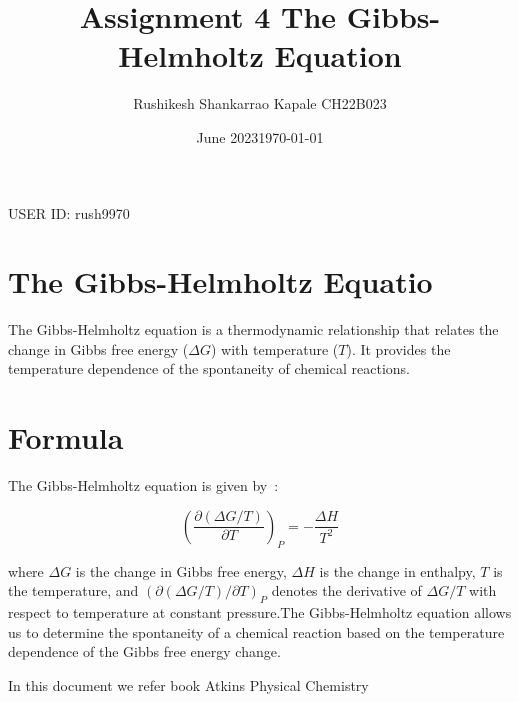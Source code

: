 \documentclass[12pt,a4paper]{article}
\title{Assignment 4 }
\author{Rushikesh Shankarrao Kapale CH22B023}
\date{June 2023}
\begin{document}
\maketitle
\begin{center}
    USER ID: rush9970
\end{center}
\title{The Gibbs-Helmholtz Equation}

\date{\today}



\maketitle

\section{The Gibbs-Helmholtz Equatio}
The Gibbs-Helmholtz equation is a thermodynamic relationship that relates the change in Gibbs free energy (\(\Delta G\)) with temperature (\(T\)). It provides  the temperature dependence of the spontaneity of chemical reactions. 

\section{Formula}
The Gibbs-Helmholtz equation is given by~\cite{Atkins}:

\begin{equation}
\left(\frac{\partial (\Delta G / T)}{\partial T}\right)_P = -\frac{\Delta H}{T^2}\label{eqn:atkins}
\end{equation}

where \(\Delta G\) is the change in Gibbs free energy, \(\Delta H\) is the change in enthalpy, \(T\) is the temperature, and \((\partial (\Delta G / T) / \partial T)_P\) denotes the derivative of \(\Delta G / T\) with respect to temperature at constant pressure.The Gibbs-Helmholtz equation allows us to determine the spontaneity of a chemical reaction based on the temperature dependence of the Gibbs free energy change. 

In this document we refer book Atkins Physical Chemistry




\end{document}

